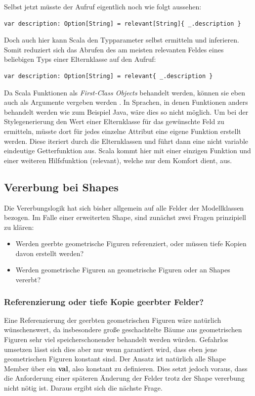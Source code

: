 Selbst jetzt müsste der Aufruf eigentlich noch wie folgt aussehen:
\begin{lstlisting}[style=scala]
var description: Option[String] = relevant[String]{ _.description }
\end{lstlisting}Doch auch hier kann Scala den Typparameter selbst ermitteln und inferieren. Somit reduziert sich das Abrufen des am meisten relevanten Feldes eines beliebigen Typs einer Elternklasse auf den Aufruf:
\begin{lstlisting}[style=scala]
var description: Option[String] = relevant{ _.description }
\end{lstlisting}Da Scala Funktionen als \textit{First-Class Objects} behandelt werden, können sie eben auch als Argumente vergeben werden \citet[p. 244]{esser:scala}. In Sprachen, in denen Funktionen anders behandelt werden wie zum Beispiel Java, wäre dies so nicht möglich. Um bei der Stylegenerierung den Wert einer Elternklasse für das gewünschte Feld zu ermitteln, müsste dort für jedes einzelne Attribut eine eigene Funktion erstellt werden. Diese iteriert durch die Elternklassen und führt dann eine nicht variable eindeutige Getterfunktion aus. Scala kommt hier mit einer einzigen Funktion und einer weiteren Hilfsfunktion (relevant), welche nur dem Komfort dient, aus.

\subsection{Vererbung bei Shapes}\label{shapeinheritance}Die Vererbungslogik hat sich bisher allgemein auf alle Felder der Modellklassen bezogen. Im Falle einer erweiterten Shape, sind zunächst zwei Fragen prinzipiell zu klären:
\begin{itemize}
\item Werden geerbte geometrische Figuren referenziert, oder müssen tiefe Kopien davon erstellt werden?
\item Werden geometrische Figuren an geometrische Figuren oder an Shapes vererbt?
\end{itemize}
\subsubsection{Referenzierung oder tiefe Kopie geerbter Felder?}\label{referenceorclone}
Eine Referenzierung der geerbten geometrischen Figuren wäre natürlich wünschenswert, da insbesondere große geschachtelte Bäume aus geometrischen Figuren sehr viel speicherschonender behandelt werden würden. Gefahrlos umsetzen lässt sich dies aber nur wenn garantiert wird, dass eben jene geometrischen Figuren konstant sind.
Der Ansatz ist natürlich alle Shape Member über ein \textbf{val}, also konstant zu definieren. Dies setzt jedoch voraus, dass die Anforderung einer späteren Änderung der Felder trotz der Shape vererbung nicht nötig ist. Daraus ergibt sich die nächste Frage.
